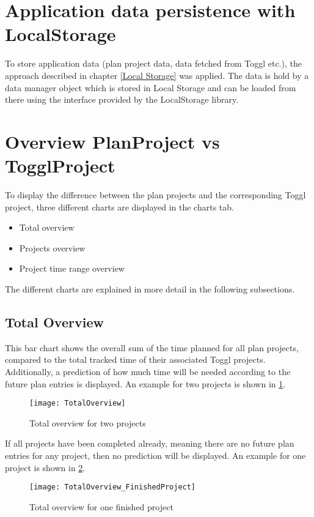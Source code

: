 \section{Application data persistence with LocalStorage}
To store application data (plan project data, data fetched from Toggl etc.), the approach described in chapter \ref{Local Storage} was applied. The data is hold by a data manager object which is stored in Local Storage and can be loaded from there using the interface provided by the LocalStorage library.

\section{Overview PlanProject vs TogglProject} \label{Graphical overview}
To display the difference between the plan projects and the corresponding Toggl project, three different charts are displayed in the charts tab.
\begin{itemize}
	\item Total overview
	\item Projects overview
	\item Project time range overview
\end{itemize}
The different charts are explained in more detail in the following subsections.

\subsection{Total Overview}
This bar chart shows the overall sum of the time planned for all plan projects, compared to the total tracked time of their associated Toggl projects. Additionally, a prediction of how much time will be needed according to the future plan entries is displayed. An example for two projects is shown in \ref{figure9}.
\begin{figure}[H]
	\centering
	\texttt{[image: TotalOverview]}
	\caption{Total overview for two projects}
	\label{figure9}
\end{figure}
If all projects have been completed already, meaning there are no future plan entries for any project, then no prediction will be displayed. An example for one project is shown in \ref{figure10}.
\begin{figure}[H]
	\centering
	\texttt{[image: TotalOverview\_FinishedProject]}
	\caption{Total overview for one finished project}
	\label{figure10}
\end{figure}

